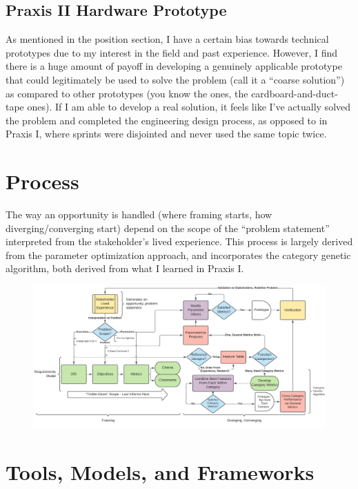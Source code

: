 \documentclass{report}
\begin{document}

\subsection{Praxis II Hardware Prototype}
As mentioned in the position section, I have a certain bias towards technical 
prototypes due to my interest in the field and past experience. However, I 
find there is a huge amount of payoff in developing a genuinely applicable 
prototype that could legitimately be used to solve the problem (call it a 
“coarse solution”) as compared to other prototypes (you know the ones, the 
cardboard-and-duct-tape ones). If I am able to develop a real solution, it 
feels like I’ve actually solved the problem and completed the engineering 
design process, as opposed to in Praxis I, where sprints were disjointed and 
never used the same topic twice.


\pagebreak

\section{Process}
The way an opportunity is handled (where framing starts, how diverging/converging 
start) depend on the scope of the “problem statement” interpreted from the 
stakeholder’s lived experience. This process is largely derived from the 
parameter optimization approach, and incorporates the category genetic algorithm, 
both derived from what I learned in Praxis I.

\begin{figure}[h]
    \centering
    \includegraphics[width=\textwidth]{images/process.png}
    \hfill
\end{figure}

\pagebreak
\section{Tools, Models, and Frameworks}
\end{document}
